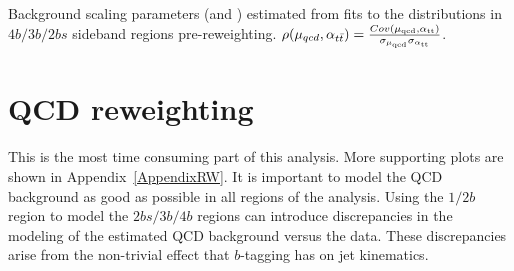 \begin{table}[htbp!]
\begin{center}
\caption{Background scaling parameters (\muqcd and \alphatt) estimated from fits to the \mleadJ distributions in $4b/3b/2bs$ sideband regions pre-reweighting. $\rho(\mu_{qcd},\alpha_{t\bar{t}}) = \frac{Cov(\rm \mu_{qcd},\rm \alpha_{\rm tt})}{\rm \sigma_{\mu_{qcd}} \rm \sigma_{\rm \alpha_{ tt}} }$.}

\label{tab:bkgfit_prereweight}
\end{center}
\end{table}



\section{QCD reweighting}
\label{sec:boosted-reweight}

\paragraph{}
This is the most time consuming part of this analysis. 
More supporting plots are shown in Appendix~\ref{AppendixRW}.
It is important to model the QCD background as good as possible in all regions of the analysis.
Using the $1/2b$ region to model the $2bs/3b/4b$ regions can introduce discrepancies in the modeling of the estimated QCD background versus the data. 
These discrepancies arise from the non-trivial effect that $b$-tagging has on jet kinematics.

